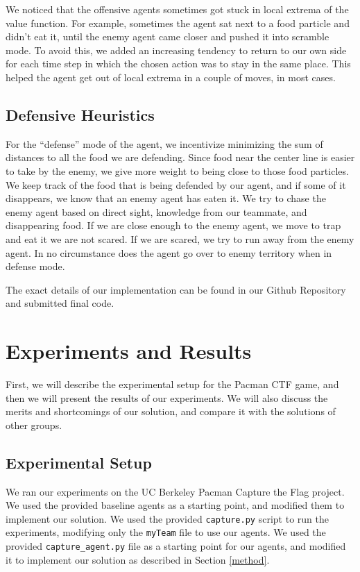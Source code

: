 \documentclass[a4paper,12pt]{article}
\begin{document}
We noticed that the offensive agents sometimes got stuck in local extrema of the value function. For example, sometimes the agent sat next to a food particle and didn't eat it, until the enemy agent came closer and pushed it into scramble mode. To avoid this, we added an increasing tendency to return to our own side for each time step in which the chosen action was to stay in the same place. This helped the agent get out of local extrema in a couple of moves, in most cases.

\subsection{Defensive Heuristics}
\label{subsec:defensive_heuristics}

For the ``defense'' mode of the agent, we incentivize minimizing the sum of distances to all the food we are defending. Since food near the center line is easier to take by the enemy, we give more weight to being close to those food particles. We keep track of the food that is being defended by our agent, and if some of it disappears, we know that an enemy agent has eaten it. We try to chase the enemy agent based on direct sight, knowledge from our teammate, and disappearing food. If we are close enough to the enemy agent, we move to trap and eat it we are not scared. If we are scared, we try to run away from the enemy agent. In no circumstance does the agent go over to enemy territory when in defense mode.

The exact details of our implementation can be found in our Github Repository and submitted final code.

\section{Experiments and Results}
\label{sec:experiments_and_results}

First, we will describe the experimental setup for the Pacman CTF game, and then we will present the results of our experiments. We will also discuss the merits and shortcomings of our solution, and compare it with the solutions of other groups.

\subsection{Experimental Setup}
\label{subsec:experimental_setup}

We ran our experiments on the UC Berkeley Pacman Capture the Flag project. We used the provided baseline agents as a starting point, and modified them to implement our solution. We used the provided \texttt{capture.py} script to run the experiments, modifying only the \texttt{myTeam} file to use our agents. We used the provided \texttt{capture\_agent.py} file as a starting point for our agents, and modified it to implement our solution as described in Section \ref{method}.
\end{document}
